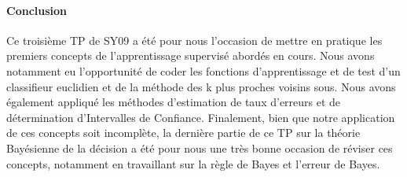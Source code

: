 \documentclass{report}
\begin{document}
\paragraph{Conclusion}
Ce troisième TP de SY09 a été pour nous l'occasion de mettre en pratique les premiers concepts de l'apprentissage supervisé abordés en cours. Nous avons notamment eu l'opportunité de coder les fonctions d'apprentissage et de test d'un classifieur euclidien et de la méthode des k plus proches voisins sous. Nous avons également appliqué les méthodes d'estimation de taux d'erreurs et de détermination d'Intervalles de Confiance. Finalement, bien que notre application de ces concepts soit incomplète, la dernière partie de ce TP sur la théorie Bayésienne de la décision a été pour nous une très bonne occasion de réviser ces concepts, notamment en travaillant sur la règle de Bayes et l'erreur de Bayes.
\end{document}
